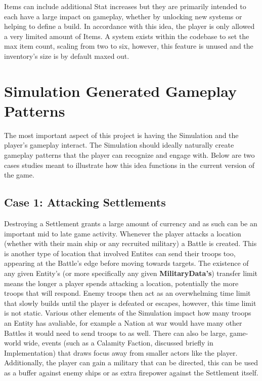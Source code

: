 \documentclass{report}
\begin{document}
Items can include additional Stat increases but they are primarily intended to each have a large impact on gameplay, whether by unlocking new systems or helping to define a build. In accordance with this idea, the player is only allowed a very limited amount of Items. A system exists within the codebase to set the max item count, scaling from two to six, however, this feature is unused and the inventory's size is by default maxed out.

\section{Simulation Generated Gameplay Patterns}

The most important aspect of this project is having the Simulation and the player's gameplay interact. The Simulation should ideally naturally create gameplay patterns that the player can recognize and engage with. Below are two cases studies meant to illustrate how this idea functions in the current version of the game.

\subsection{Case 1: Attacking Settlements}

Destroying a Settlement grants a large amount of currency and as such can be an important mid to late game activity. Whenever the player attacks a location (whether with their main ship or any recruited military) a Battle is created. This is another type of location that involved Entites can send their troops too, appearing at the Battle's edge before moving towards targets. The existence of any given Entity's (or more specifically any given \textbf{MilitaryData's}) transfer limit means the longer a player spends attacking a location, potentially the more troops that will respond. Enemy troops then act as an overwhelming time limit that slowly builds until the player is defeated or escapes, however, this time limit is not static. Various other elements of the Simulation impact how many troops an Entity has avaliable, for example a Nation at war would have many other Battles it would need to send troops to as well. There can also be large, game-world wide, events (such as a Calamity Faction, discussed briefly in Implementation) that draws focus away from smaller actors like the player. Additionally, the player can gain a military that can be directed, this can be used as a buffer against enemy ships or as extra firepower against the Settlement itself.
\end{document}
